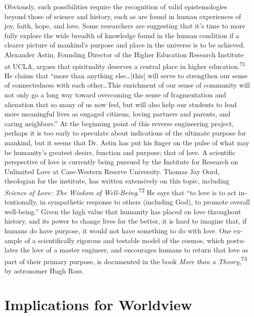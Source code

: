 Obviously, such possibilities require the recognition of valid
epistemologies beyond those of science and history, such as are found
in human experiences of joy, faith, hope, and love. Some researchers
are suggesting that it’s time to more fully explore the wide breadth of
knowledge found in the human condition if a clearer picture of
mankind’s purpose and place in the universe is to be achieved.
Alexander Astin, Founding Director of the Higher Education Research
Institute at UCLA, argues that spirituality deserves a central place in
higher education.\textsuperscript{71} He claims that “more than
anything else…[this] will serve to strengthen our sense of
connectedness with each other…This enrichment of our sense of community
will not only go a long way toward overcoming the sense of
fragmentation and alienation that so many of us now feel, but will also
help our students to lead more meaningful lives as engaged citizens,
loving partners and parents, and caring neighbors.” At the beginning
point of this reverse engineering project, perhaps it is too early to
speculate about indications of the ultimate purpose for mankind, but it
seems that Dr. Astin has put his finger on the pulse of what may be
humanity’s greatest desire, function and purpose; that of love. A
scientific perspective of love is currently being pursued by the
Institute for Research on Unlimited Love at Case-Western Reserve
University. Thomas Jay Oord, theologian for the institute, has written
extensively on this topic, including \textit{Science of Love: The
Wisdom of Well-Being}.\textsuperscript{72} He says that
“\foreignlanguage{english}{to love is to act intentionally, in
sympathetic response to others (including God), to promote overall
well-being.” Given the high value that humanity has placed on love
throughout history, and its power to change lives for the better, it is
hard to imagine that, if humans do have purpose, it would not have
something to do with love. One example of a scientifically rigorous and
testable model of the cosmos, which postulates the love of a master
engineer, and encourages humans to return that love as part of their
primary purpose, is documented in the book
}\foreignlanguage{english}{\textit{More than a
Theory,}}\foreignlanguage{english}{\textsuperscript{73}}\foreignlanguage{english}{
by astronomer Hugh Ross.}

\section{Implications for Worldview}

